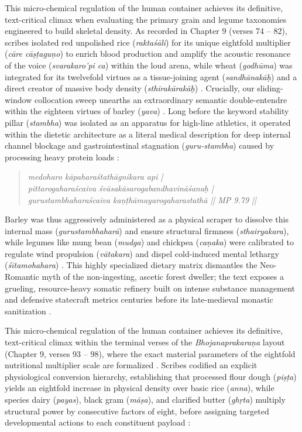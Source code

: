 \documentclass[11pt,twoside,letterpaper]{article}
\begin{document}
This micro-chemical regulation of the human container achieves its definitive, text-critical climax when evaluating the primary grain and legume taxonomies engineered to build skeletal density. As recorded in Chapter 9 (verses 74 -- 82), scribes isolated red unpolished rice (\textit{rakta\'s\={a}li}) for its unique eightfold multiplier (\textit{c\={a}re c\={a}\d{s}\d{t}agu\d{n}o}) to enrich blood production and amplify the acoustic resonance of the voice (\textit{svarakaro'pi ca}) within the loud arena, while wheat (\textit{godh\={u}ma}) was integrated for its twelvefold virtues as a tissue-joining agent (\textit{sandh\={a}nak\={a}\d{h}}) and a direct creator of massive body density (\textit{sthirak\={a}rak\={a}\d{h}}) \citep{MP_7_v13}. Crucially, our sliding-window collocation sweep unearths an extraordinary semantic double-entendre within the eighteen virtues of barley (\textit{yava}) \citep{MP_7_v14}. Long before the keyword stability pillar (\textit{stambha}) was isolated as an apparatus for high-line athletics, it operated within the dietetic architecture as a literal medical description for deep internal channel blockage and gastrointestinal stagnation (\textit{guru-stambha}) caused by processing heavy protein loads \citep{MP_7_v15}:

\begin{quote}
\small
\textit{medoharo k\={a}pahara\'stath\={a}gnikara api | \\
pittarogahara\'scaiva \'sv\={a}sak\={a}sarogabandhavin\={a}\'sana\d{h} | \\
gurustambhahara\'scaiva ka\d{n}\d{t}h\={a}mayarogaharastath\={a} || MP 9.79 ||}
\end{quote}

Barley was thus aggressively administered as a physical scraper to dissolve this internal mass (\textit{gurustambhahar\={a}}) and ensure structural firmness (\textit{sthairyakara}), while legumes like mung bean (\textit{mudga}) and chickpea (\textit{ca\d{n}aka}) were calibrated to regulate wind propulsion (\textit{v\={a}takara}) and dispel cold-induced mental lethargy (\textit{\'s\={i}tamohahara}) \citep{MP_7_v16}. This highly specialized dietary matrix dismantles the Neo-Romantic myth of the non-ingesting, ascetic forest dweller; the text exposes a grueling, resource-heavy somatic refinery built on intense substance management and defensive statecraft metrics centuries before its late-medieval monastic sanitization \citep{MP_7_v17, Wujastyk2025}.

This micro-chemical regulation of the human container achieves its definitive, text-critical climax within the terminal verses of the \textit{Bhojanaprakara\d{n}a} layout (Chapter 9, verses 93 -- 98), where the exact material parameters of the eightfold nutritional multiplier scale are formalized \citep{MP_7_v18}. Scribes codified an explicit physiological conversion hierarchy, establishing that processed flour dough (\textit{pi\d{s}\d{t}a}) yields an eightfold increase in physical density over basic rice (\textit{anna}), while species dairy (\textit{payas}), black gram (\textit{m\={a}\d{s}a}), and clarified butter (\textit{gh\d{r}ta}) multiply structural power by consecutive factors of eight, before assigning targeted developmental actions to each constituent payload \citep{MP_7_v19}:
\end{document}
